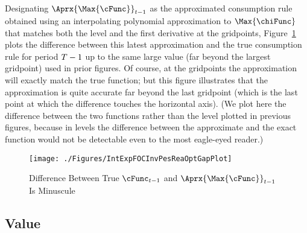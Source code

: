 \documentclass[SolvingMicroDSOPs]{subfiles}
\begin{document}
Designating $\Aprx{\Max{\cFunc}}_{\prd-1}$ as the approximated consumption rule obtained using an interpolating polynomial approximation to $\Max{\chiFunc}$ that matches both the level and the first derivative at the gridpoints, Figure~\ref{fig:IntExpFOCInvPesReaOptGapPlot} plots the difference between this latest approximation and the true consumption rule for period $T-1$ up to the same large value (far beyond the largest gridpoint) used in prior figures.  Of course, at the gridpoints the approximation will exactly match the true function; but this figure illustrates that the approximation is quite accurate far beyond the last gridpoint (which is the last point at which the difference touches the horizontal axis).  (We plot here the difference between the two functions rather than the level plotted in previous figures, because in levels the difference between the approximate and the exact function would not be detectable even to the most eagle-eyed reader.)



\hypertarget{IntExpFOCInvPesReaOptGapPlot}{}
\begin{figure}
  \texttt{[image: ./Figures/IntExpFOCInvPesReaOptGapPlot]}
  \caption{Difference Between True $\cFunc_{\prd-1}$ and $\Aprx{\Max{\cFunc}}_{\prd-1}$ Is Minuscule}
  \label{fig:IntExpFOCInvPesReaOptGapPlot}
\end{figure}




\hypertarget{value}{}
\subsection{Value}
\end{document}

